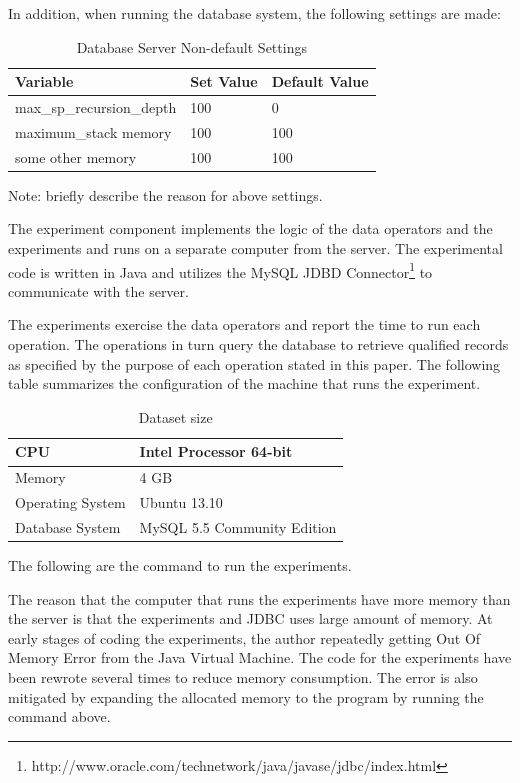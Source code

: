 In addition, when running the database system, the following settings are made:

\begin{table}[h]
\centering
\begin{tabular}{|l|l|l|}
\hline
Variable & Set Value & Default Value \\ \hline
max\_sp\_recursion\_depth & 100 & 0 \\ \hline
maximum\_stack memory & 100 & 100 \\ \hline
some other memory & 100 & 100 \\ \hline
\end{tabular}
\caption{Database Server Non-default Settings\label{table:tbl_server_settings}}
\end{table}

Note: briefly describe the reason for above settings.

The experiment component implements the logic of the data operators and the experiments and runs on a separate computer from the server. The experimental code is written in Java and utilizes the MySQL JDBD Connector\footnote{http://www.oracle.com/technetwork/java/javase/jdbc/index.html} to communicate with the server.

The experiments exercise the data operators and report the time to run each operation. The operations in turn query the database to retrieve qualified records as specified by the purpose of each operation stated in this paper. The following table summarizes the configuration of the machine that runs the experiment.

\begin{table}[h]
\centering
\begin{tabular}{|l|l|}
\hline
CPU & Intel Processor 64-bit \\ \hline
Memory & 4 GB \\ \hline
Operating System & Ubuntu 13.10 \\ \hline
Database System & MySQL 5.5 Community Edition \\ \hline 
\end{tabular}
\caption{Dataset size\label{table:tbl_server_config}}
\end{table}

The following are the command to run the experiments.

The reason that the computer that runs the experiments have more memory than the server is that the experiments and JDBC uses large amount of memory. At early stages of coding the experiments, the author repeatedly getting Out Of Memory Error from the Java Virtual Machine. The code for the experiments have been rewrote several times to reduce memory consumption. The error is also mitigated by expanding the allocated memory to the program by running the command above.


